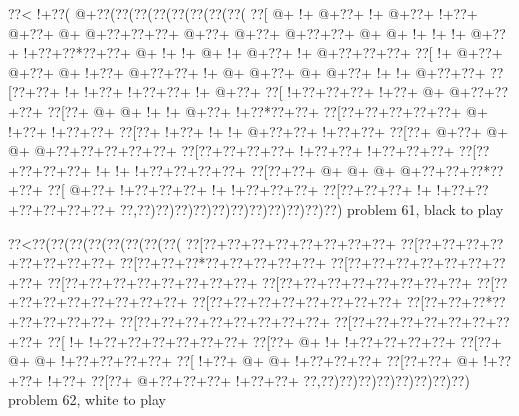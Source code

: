 \vbox{\vbox{\goo
\0??<\- !+\0??(\- @+\0??(\0??(\0??(\0??(\0??(\0??(\0??(\0??(
\0??[\- @+\- !+\- @+\0??+\- !+\- @+\0??+\- !+\0??+\- @+\0??+
\- @+\- @+\0??+\0??+\0??+\- @+\0??+\- @+\0??+\- @+\0??+\0??+
\- @+\- @+\- !+\- !+\- !+\- @+\0??+\- !+\0??+\0??*\0??+\0??+
\- @+\- !+\- !+\- @+\- !+\- @+\0??+\- !+\- @+\0??+\0??+\0??+
\0??[\- !+\- @+\0??+\- @+\0??+\- @+\- !+\0??+\- @+\0??+\0??+
\- !+\- @+\- @+\0??+\- @+\- @+\0??+\- !+\- !+\- @+\0??+\0??+
\0??[\0??+\0??+\- !+\- !+\0??+\- !+\0??+\0??+\- !+\- @+\0??+
\0??[\- !+\0??+\0??+\0??+\- !+\0??+\- @+\- @+\0??+\0??+\0??+
\0??[\0??+\- @+\- @+\- !+\- !+\- @+\0??+\- !+\0??*\0??+\0??+
\0??[\0??+\0??+\0??+\0??+\0??+\- @+\- !+\0??+\- !+\0??+\0??+
\0??[\0??+\- !+\0??+\- !+\- !+\- @+\0??+\0??+\- !+\0??+\0??+
\0??[\0??+\- @+\0??+\- @+\- @+\- @+\0??+\0??+\0??+\0??+\0??+
\0??[\0??+\0??+\0??+\0??+\- !+\0??+\0??+\- !+\0??+\0??+\0??+
\0??[\0??+\0??+\0??+\0??+\- !+\- !+\- !+\0??+\0??+\0??+\0??+
\0??[\0??+\0??+\- @+\- @+\- @+\- @+\0??+\0??+\0??*\0??+\0??+
\0??[\- @+\0??+\- !+\0??+\0??+\0??+\- !+\- !+\0??+\0??+\0??+
\0??[\0??+\0??+\0??+\- !+\- !+\0??+\0??+\0??+\0??+\0??+\0??+
\0??,\0??)\0??)\0??)\0??)\0??)\0??)\0??)\0??)\0??)\0??)\0??)
}
\hfil problem 61, black to play\hfil\break
}

\vbox{\vbox{\goo
\0??<\0??(\0??(\0??(\0??(\0??(\0??(\0??(\0??(
\0??[\0??+\0??+\0??+\0??+\0??+\0??+\0??+\0??+
\0??[\0??+\0??+\0??+\0??+\0??+\0??+\0??+\0??+
\0??[\0??+\0??+\0??*\0??+\0??+\0??+\0??+\0??+
\0??[\0??+\0??+\0??+\0??+\0??+\0??+\0??+\0??+
\0??[\0??+\0??+\0??+\0??+\0??+\0??+\0??+\0??+
\0??[\0??+\0??+\0??+\0??+\0??+\0??+\0??+\0??+
\0??[\0??+\0??+\0??+\0??+\0??+\0??+\0??+\0??+
\0??[\0??+\0??+\0??+\0??+\0??+\0??+\0??+\0??+
\0??[\0??+\0??+\0??*\0??+\0??+\0??+\0??+\0??+
\0??[\0??+\0??+\0??+\0??+\0??+\0??+\0??+\0??+
\0??[\0??+\0??+\0??+\0??+\0??+\0??+\0??+\0??+
\0??[\- !+\- !+\0??+\0??+\0??+\0??+\0??+\0??+
\0??[\0??+\- @+\- !+\- !+\0??+\0??+\0??+\0??+
\0??[\0??+\- @+\- @+\- !+\0??+\0??+\0??+\0??+
\0??[\- !+\0??+\- @+\- @+\- !+\0??+\0??+\0??+
\0??[\0??+\0??+\- @+\- !+\0??+\0??+\- !+\0??+
\0??[\0??+\- @+\0??+\0??+\0??+\- !+\0??+\0??+
\0??,\0??)\0??)\0??)\0??)\0??)\0??)\0??)\0??)
}
\hfil problem 62, white to play\hfil\break
}

